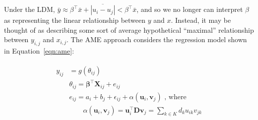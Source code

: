 \documentclass[11pt,pdflatex]{elsarticle}
\newcommand{\pkg}[1]{{\fontseries{b}\selectfont #1}}
\begin{document}
Under the LDM, $\bar y  \approx \beta^\top \bar x + \overline{ |u_i- u_j|  } < \beta^\top \bar x$, and so we no longer can interpret $\beta$ as representing the linear relationship between $y$ and $x$. Instead, it may be thought of as describing some sort of average hypothetical ``maximal'' relationship between $y_{i,j}$ and $x_{i,j}$. The AME approach considers the regression model shown in Equation~\ref{eqn:ame}:

\begin{align}
\begin{aligned}
	y_{ij} &= g(\theta_{ij}) \\ 
	&\theta_{ij} = \bm\beta^{\top} \mathbf{X}_{ij} + e_{ij} \\
	&e_{ij} = a_{i} + b_{j}  + \epsilon_{ij} + \alpha(\textbf{u}_{i}, \textbf{v}_{j}) \text{  , where } \\
	&\qquad \alpha(\textbf{u}_{i}, \textbf{v}_{j}) = \textbf{u}_{i}^{\top} \textbf{D} \textbf{v}_{j} = \sum_{k \in K} d_{k} u_{ik} v_{jk} \\ 
\label{eqn:ame}
\end{aligned}
\end{align}

\end{document}
